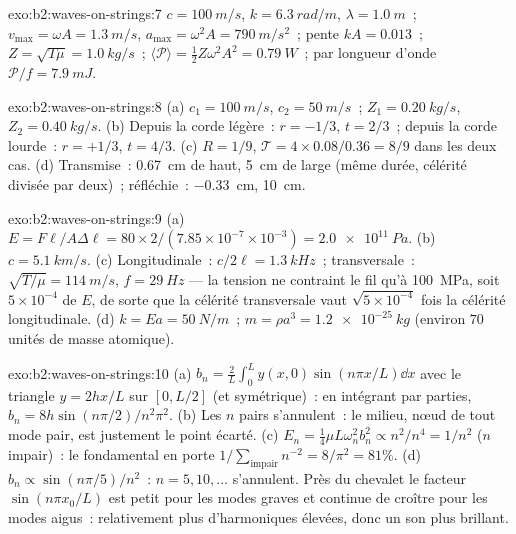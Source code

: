 \begin{solution}{exo:b2:waves-on-strings:7}
$c = \qty{100}{m/s}$, $k = \qty{6.3}{rad/m}$, $\lambda = \qty{1.0}{m}$~; $v_{\max} = \omega A =
\qty{1.3}{m/s}$, $a_{\max} = \omega^2A = \qty{790}{m/s^2}$~; pente $kA = 0.013$~; $Z =
\sqrt{T\mu} = \qty{1.0}{kg/s}$~; $\langle\mathcal P\rangle = \tfrac12Z\omega^2A^2 = \qty{0.79}{W}$~;
par longueur d'onde $\mathcal P/f = \qty{7.9}{mJ}$.
\end{solution}

\begin{solution}{exo:b2:waves-on-strings:8}
(a) $c_1 = \qty{100}{m/s}$, $c_2 = \qty{50}{m/s}$~; $Z_1 = \qty{0.20}{kg/s}$, $Z_2 = \qty{0.40}{kg/s}$.
(b) Depuis la corde légère~: $r = -1/3$, $t = 2/3$~; depuis la corde lourde~: $r =
+1/3$, $t = 4/3$. (c) $R = 1/9$, $\mathcal T = 4 \times 0.08/0.36 = 8/9$ dans les deux cas.
(d) Transmise~: \qty{0.67}{cm} de haut, \qty{5}{cm} de large (même durée, célérité
divisée par deux)~; réfléchie~: \qty{-0.33}{cm}, \qty{10}{cm}.
\end{solution}

\begin{solution}{exo:b2:waves-on-strings:9}
(a) $E = F\ell/A\Delta\ell = 80 \times 2/(7.85 \times 10^{-7} \times 10^{-3}) = \qty{2.0e11}{Pa}$.
(b) $c = \qty{5.1}{km/s}$. (c) Longitudinale~: $c/2\ell = \qty{1.3}{kHz}$~; transversale~:
$\sqrt{T/\mu} = \qty{114}{m/s}$, $f = \qty{29}{Hz}$ --- la tension ne contraint le
fil qu'à \qty{100}{MPa}, soit $5 \times 10^{-4}$ de $E$, de sorte que la célérité transversale vaut
$\sqrt{5 \times 10^{-4}}$ fois la célérité longitudinale. (d) $k = Ea = \qty{50}{N/m}$~; $m
= \rho a^3 = \qty{1.2e-25}{kg}$ (environ $70$ unités de masse atomique).
\end{solution}

\begin{solution}{exo:b2:waves-on-strings:10}
(a) $b_n = \frac2L\int_0^Ly(x, 0)\sin(n\pi x/L)\dd x$ avec le triangle $y =
2hx/L$ sur $[0, L/2]$ (et symétrique)~: en intégrant par parties, $b_n = 8h\sin(n\pi/2)
/n^2\pi^2$. (b) Les $n$ pairs s'annulent~: le milieu, nœud de tout mode pair,
est justement le point écarté. (c) $E_n = \tfrac14\mu L\omega_n^2b_n^2 \propto n^2/n^4 = 1/n^2$
($n$ impair)~: le fondamental en porte $1/\sum_{\text{impair}}n^{-2} = 8/\pi^2 = 81\%$. (d)
$b_n \propto \sin(n\pi/5)/n^2$~: $n = 5, 10, \dots$ s'annulent. Près du chevalet le
facteur $\sin(n\pi x_0/L)$ est petit pour les modes graves et continue de croître
pour les modes aigus~: relativement plus d'harmoniques élevées, donc un son plus brillant.
\end{solution}

